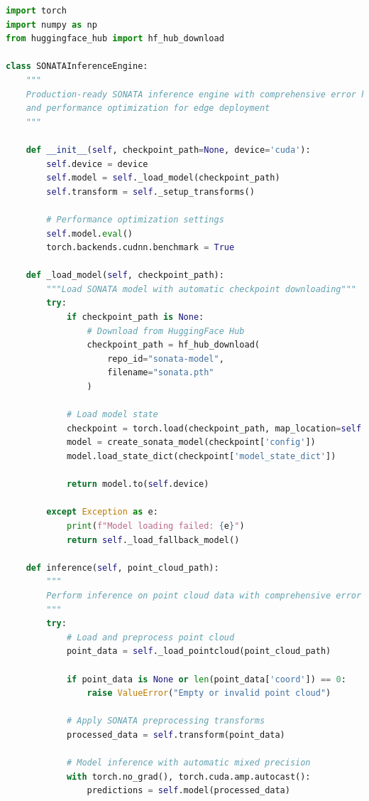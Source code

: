 \documentclass[12pt,a4paper]{report}
\begin{document}
\begin{lstlisting}[caption=SONATA Real-time Inference with Robust Error Handling, label=lst:sonata_inference, language=python]
import torch
import numpy as np
from huggingface_hub import hf_hub_download

class SONATAInferenceEngine:
    """
    Production-ready SONATA inference engine with comprehensive error handling
    and performance optimization for edge deployment
    """
    
    def __init__(self, checkpoint_path=None, device='cuda'):
        self.device = device
        self.model = self._load_model(checkpoint_path)
        self.transform = self._setup_transforms()
        
        # Performance optimization settings
        self.model.eval()
        torch.backends.cudnn.benchmark = True
        
    def _load_model(self, checkpoint_path):
        """Load SONATA model with automatic checkpoint downloading"""
        try:
            if checkpoint_path is None:
                # Download from HuggingFace Hub
                checkpoint_path = hf_hub_download(
                    repo_id="sonata-model", 
                    filename="sonata.pth"
                )
            
            # Load model state
            checkpoint = torch.load(checkpoint_path, map_location=self.device)
            model = create_sonata_model(checkpoint['config'])
            model.load_state_dict(checkpoint['model_state_dict'])
            
            return model.to(self.device)
            
        except Exception as e:
            print(f"Model loading failed: {e}")
            return self._load_fallback_model()
    
    def inference(self, point_cloud_path):
        """
        Perform inference on point cloud data with comprehensive error handling
        """
        try:
            # Load and preprocess point cloud
            point_data = self._load_pointcloud(point_cloud_path)
            
            if point_data is None or len(point_data['coord']) == 0:
                raise ValueError("Empty or invalid point cloud")
            
            # Apply SONATA preprocessing transforms
            processed_data = self.transform(point_data)
            
            # Model inference with automatic mixed precision
            with torch.no_grad(), torch.cuda.amp.autocast():
                predictions = self.model(processed_data)
            

\end{lstlisting}
\end{document}
